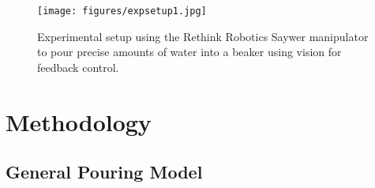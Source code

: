 \begin{figure}[t!]
\centering
\texttt{[image: figures/expsetup1.jpg]} \label{fig:expsetup2}
    \caption{Experimental setup using the Rethink Robotics Saywer manipulator to pour precise amounts of water into a beaker using vision for feedback control.} \label{fig:exp_setup_isometric_sawyer}
\end{figure}



\section{Methodology}\label{sec:Methods}
\begin{comment}
Outline
1. General Model
  a) Pouring Problem and representation (General Form)
      i)Represent Volume in both containers
      ii) Represent flowrate in both containers, bringing to general form
      iii) derive all general forms of terms in the general flowrate eqn
  b) Vision Techniques
  c) Challenges with arbitrary Container shapes
2. Specific Model
  a) Present specific model (rectangular pouring container, in figure)
  b) present thrm and proof that this model provides desired simplification:

	Thm1: Rectangular container \alpha parameterized by (H_\alpha, L_{L,\alpha},W,l,\theta) allows for the representation of the entire system state solely in the measured height and of the fluid in the poured to flask h, its derivative \dot{h}, angle of the poured container and wrist $\theta$ with input being angular velocity of the wrist $\omega$.
Proof: substitution of analytical model to represent dynamics in only these terms

	c) Present thrm and proof that this model stays within the controllable region with our hybrid control structure given it starts in the required domain.
	Thm2: The proposed analytical model and resultant feedback control is valid in the domain $D_0$ specified by non-zero $x_2 = \dot{h} \neq 0$, and $x_3 = \theta \in (-\frac{\pi}{2}, \frac{\pi}{2})$. And our hybrid control keeps the system in $D_0$, for states starting within D_0 and the point (x_1, x_2=0, x_3=0).
  Proof: represent system states (x1,x2,x3) =(h,dh,th), provide domain for feedback linearization {x2!=0, x2&x3 !=0 simultaneously, x1 in (-pi/2,pi/2)}

\end{comment}



\subsection{General Pouring Model}\label{sec:Gen_Pour_Mod}


